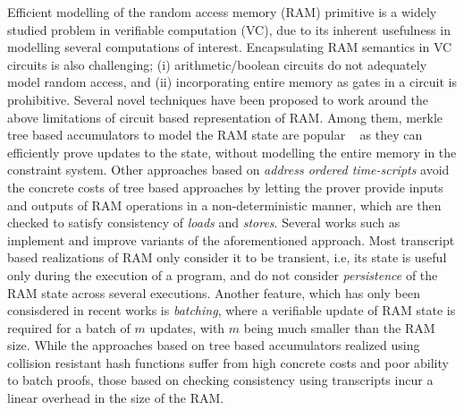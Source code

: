 Efficient modelling of the random access memory (RAM) primitive is a widely studied problem in
verifiable computation (VC), due to its inherent usefulness in modelling several computations of interest.
Encapsulating RAM semantics in VC circuits is also challenging; (i) arithmetic/boolean circuits do not
adequately model random access, and (ii) incorporating entire memory as gates in a circuit is prohibitive.
Several novel techniques have been proposed to work around the above limitations of circuit based representation
of RAM. Among them, merkle tree based accumulators to model the RAM state are popular
~\cite{EPRINT:BFRSBW13,compwithstate,C:BCTV14} as they can efficiently
prove updates to the state, without modelling the entire memory in the constraint system. Other
approaches based on {\em address ordered time-scripts} avoid the concrete costs of tree based approaches
by letting the prover provide inputs and outputs of RAM operations in a non-deterministic manner, which
are then checked to satisfy consistency of {\em loads} and {\em stores}.
Several works such as \cite{NDSS:WSRBW15,USENIX:BCTV14,C:BCGTV13,SP:ZGKPP18} implement and improve variants
of the aforementioned approach. Most transcript based realizations of RAM only consider it to be transient,
i.e, its state is useful only during the execution of a program, and do not consider {\em persistence} of the
RAM state across several executions. Another feature, which has only been consisdered in recent works
\cite{USENIX:OWWB20,CCS:CFHKKO22} is {\em batching}, where a verifiable update of RAM state is required
for a batch of $m$ updates, with $m$ being much smaller than the RAM size. While the approaches based on tree
based accumulators realized using collision resistant hash functions suffer from high concrete costs and poor
ability to batch proofs, those based on checking consistency using transcripts incur a linear overhead in the
size of the RAM.

